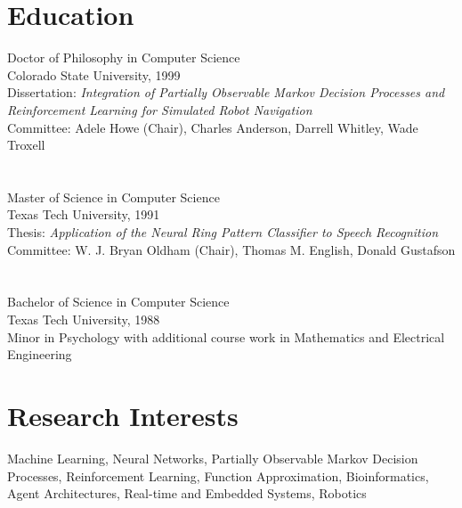 \documentclass[12pt]{resume}
\makeatletter
\newcommand\myaddress{13286 Edgewood Place\\Piedmont, SD 57769 \\
         ldpyeatt@gmail.com \\ (806)241-6151}
\renewcommand\myaddress{Department of Mathematics and Computer Science\\
  South Dakota School of Mines and Technology\\
         larry.pyeatt@sdsmt.edu}
\makeatother
\begin{document}

\pagestyle{fancyplain}
\thispagestyle{empty}

\address{\myaddress}
\line


\section{Education}
  {Doctor of Philosophy in Computer Science}
  {\\Colorado State University, 1999 \\
  Dissertation:  {\it Integration of Partially Observable Markov
Decision Processes and Reinforcement Learning for Simulated Robot 
Navigation}\\ 
  Committee: Adele Howe (Chair), Charles Anderson, 
  Darrell Whitley, Wade Troxell }
   
\section{} 
  {Master of Science in Computer Science}    
  {\\Texas Tech University, 1991 \\
  Thesis:   {\it Application of the Neural Ring Pattern Classifier
  to Speech Recognition}\\
  Committee: W. J. Bryan Oldham (Chair), Thomas M. English, Donald Gustafson}
   
\section{} 
  {Bachelor of Science in Computer Science}    
  {\\Texas Tech University, 1988 \\
  Minor in Psychology with additional course work in Mathematics and 
  Electrical Engineering}

\section{Research Interests}  
  {} {Machine Learning, Neural Networks, Partially Observable Markov
    Decision Processes, Reinforcement Learning, Function
    Approximation, Bioinformatics, Agent Architectures, Real-time and
    Embedded Systems, Robotics }
\end{document}
